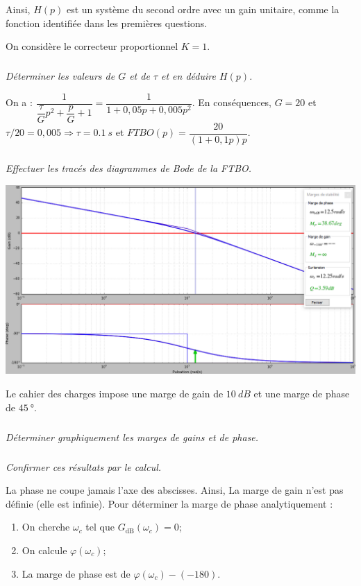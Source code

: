 \documentclass[10pt,fleqn]{article} %
\begin{document}
\begin{multicols}{2}
\begin{corrige}
Ainsi, $H(p)$ est un système du second ordre avec un gain unitaire, comme la fonction identifiée dans les premières questions. 
\end{corrige}
\else
\fi

On considère le correcteur proportionnel $K=1$. 
\subparagraph{}\textit{Déterminer les valeurs de $G$ et de $\tau$ et en déduire $H(p)$.}
\ifprof
\begin{corrige}
On a :
$\dfrac{1}{\dfrac{\tau}{G} p^2+\dfrac{p}{G}+1}
= \dfrac{1}{1+0,05p+0,005p^2}$. En conséquences, $G=20$ et $\tau/20=0,005 \Rightarrow \tau=\SI{0,1}{s}$ et $FTBO(p)=\dfrac{20}{(1+0,1p)p}$.

\end{corrige}
\else
\fi

\subparagraph{}\textit{Effectuer les tracés des diagrammes de Bode de la FTBO.}
\ifprof
\begin{corrige}

\begin{center}
\includegraphics[width=\linewidth]{images/cor_01}
\end{center}
\end{corrige}
\else
\fi
Le cahier des charges impose une marge de gain de $\SI{10}{dB}$ et une marge de phase de $
\SI{45}{\degree}$.

\subparagraph{}\textit{Déterminer graphiquement les marges de gains et de phase.}
\ifprof
\begin{corrige}
\end{corrige}
\else
\fi

\subparagraph{}\textit{Confirmer ces résultats par le calcul.}
\ifprof
\begin{corrige}
La phase ne coupe jamais l'axe des abscisses. Ainsi, La marge de gain n'est pas définie (elle est infinie).
Pour déterminer la marge de phase analytiquement :
\begin{enumerate}
\item On cherche $\omega_c$ tel que $G_{\text{dB}}(\omega_c)=0$;
\item On calcule $\varphi(\omega_c)$;
\item La marge de phase est de $\varphi(\omega_c) -(-180)$.
\end{enumerate}


\end{corrige}
\end{multicols}
\end{document}
